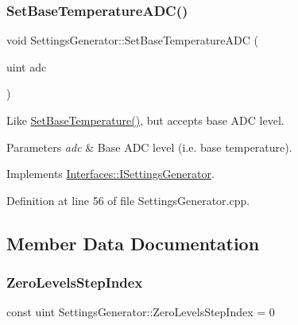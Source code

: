 \mbox{\label{class_settings_generator_a806478b651a98ce128e97c2da385c302}} 
\subsubsection{\texorpdfstring{Set\+Base\+Temperature\+A\+D\+C()}{SetBaseTemperatureADC()}}
{\footnotesize\ttfamily void Settings\+Generator\+::\+Set\+Base\+Temperature\+A\+DC (\begin{DoxyParamCaption}\item[{uint}]{adc }\end{DoxyParamCaption})\hspace{0.3cm}{\ttfamily [virtual]}}



Like \hyperlink{class_settings_generator_aed9e7acb30bfd559b1ac70ceeddd8973}{Set\+Base\+Temperature()}, but accepts base A\+DC level. 


\begin{DoxyParams}{Parameters}
{\em adc} & Base A\+DC level (i.\+e. base temperature). \\
\hline
\end{DoxyParams}


Implements \hyperlink{class_interfaces_1_1_i_settings_generator_af681d36295e95bd52cbfd1bbc3ae8cf9}{Interfaces\+::\+I\+Settings\+Generator}.



Definition at line 56 of file Settings\+Generator.\+cpp.



\subsection{Member Data Documentation}
\mbox{\label{class_settings_generator_a45b535223390381aba891c7fa7e7a29f}} 
\subsubsection{\texorpdfstring{Zero\+Levels\+Step\+Index}{ZeroLevelsStepIndex}}
{\footnotesize\ttfamily const uint Settings\+Generator\+::\+Zero\+Levels\+Step\+Index = 0\hspace{0.3cm}{\ttfamily [static]}}



